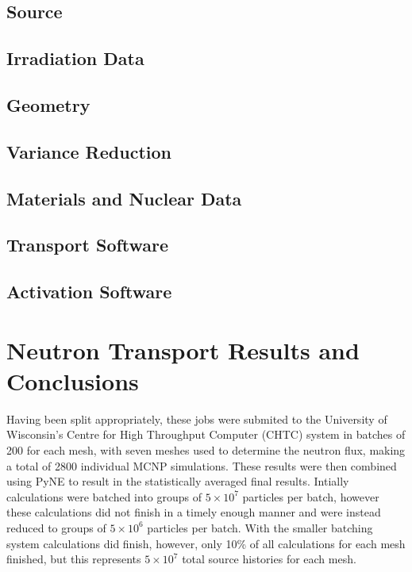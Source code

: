\documentclass[12pt]{article}
\begin{document}
\subsection{Source}
\subsection{Irradiation Data}
\subsection{Geometry}
\subsection{Variance Reduction}
\subsection{Materials and Nuclear Data}
\subsection{Transport Software}
\subsection{Activation Software}

\section{Neutron Transport Results and Conclusions}


Having been split appropriately, these jobs were submited to the University of
Wisconsin's Centre for High Throughput Computer (CHTC) system in batches of 200
for each mesh, with seven meshes used to determine the neutron flux, making a
total of 2800 individual MCNP simulations. These results were then combined
using PyNE to result in the statistically averaged final results. Intially
calculations were batched into groups of $5\times10^7$ particles per batch,
however these calculations did not finish in a timely enough manner and were
instead reduced to groups of $5\times10^6$ particles per batch. With the smaller
batching system calculations did finish, however, only 10\% of all calculations
for each mesh finished, but this represents $5\times10^7$ total source histories
for each mesh. 
\newpage
\clearpage
\end{document}
